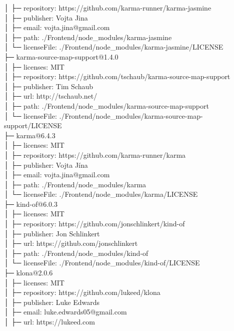 │  ├─ repository: https://github.com/karma-runner/karma-jasmine\\
│  ├─ publisher: Vojta Jina\\
│  ├─ email: vojta.jina@gmail.com\\
│  ├─ path: ./Frontend/node\_modules/karma-jasmine\\
│  └─ licenseFile: ./Frontend/node\_modules/karma-jasmine/LICENSE\\
├─ karma-source-map-support@1.4.0\\
│  ├─ licenses: MIT\\
│  ├─ repository: https://github.com/tschaub/karma-source-map-support\\
│  ├─ publisher: Tim Schaub\\
│  ├─ url: http://tschaub.net/\\
│  ├─ path: ./Frontend/node\_modules/karma-source-map-support\\
│  └─ licenseFile: ./Frontend/node\_modules/karma-source-map-support/LICENSE\\
├─ karma@6.4.3\\
│  ├─ licenses: MIT\\
│  ├─ repository: https://github.com/karma-runner/karma\\
│  ├─ publisher: Vojta Jína\\
│  ├─ email: vojta.jina@gmail.com\\
│  ├─ path: ./Frontend/node\_modules/karma\\
│  └─ licenseFile: ./Frontend/node\_modules/karma/LICENSE\\
├─ kind-of@6.0.3\\
│  ├─ licenses: MIT\\
│  ├─ repository: https://github.com/jonschlinkert/kind-of\\
│  ├─ publisher: Jon Schlinkert\\
│  ├─ url: https://github.com/jonschlinkert\\
│  ├─ path: ./Frontend/node\_modules/kind-of\\
│  └─ licenseFile: ./Frontend/node\_modules/kind-of/LICENSE\\
├─ klona@2.0.6\\
│  ├─ licenses: MIT\\
│  ├─ repository: https://github.com/lukeed/klona\\
│  ├─ publisher: Luke Edwards\\
│  ├─ email: luke.edwards05@gmail.com\\
│  ├─ url: https://lukeed.com\\
